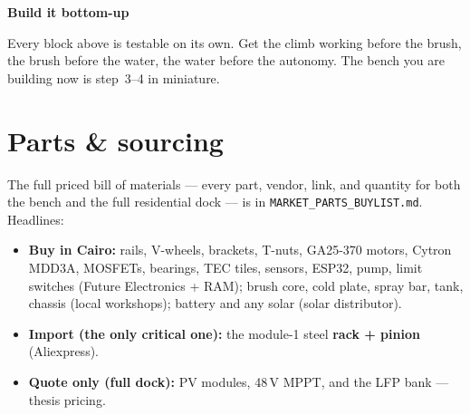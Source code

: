 \documentclass[11pt,a4paper]{article}
\newenvironment{tipbox}[1]
  {\par\medskip\noindent\begin{lrbox}{\gbbox}\begin{minipage}{0.95\linewidth}\footnotesize\textbf{#1}\par\smallskip}
  {\end{minipage}\end{lrbox}\setlength{\fboxsep}{8pt}\fcolorbox{green!45!black}{green!5}{\usebox{\gbbox}}\par\medskip}
\begin{document}
\begin{tipbox}{Build it bottom-up}
Every block above is testable on its own. Get the climb working before the brush, the brush before the
water, the water before the autonomy. The bench you are building now is step~3--4 in miniature.
\end{tipbox}

\section{Parts \& sourcing}

The full priced bill of materials --- every part, vendor, link, and quantity for both the bench and the
full residential dock --- is in \texttt{MARKET\_PARTS\_BUYLIST.md}. Headlines:

\begin{itemize}[leftmargin=*,itemsep=1pt]
  \item \textbf{Buy in Cairo:} rails, V-wheels, brackets, T-nuts, GA25-370 motors, Cytron MDD3A, MOSFETs,
  bearings, TEC tiles, sensors, ESP32, pump, limit switches (Future Electronics + RAM); brush core,
  cold plate, spray bar, tank, chassis (local workshops); battery and any solar (solar distributor).
  \item \textbf{Import (the only critical one):} the module-1 steel \textbf{rack + pinion} (Aliexpress).
  \item \textbf{Quote only (full dock):} PV modules, 48\,V MPPT, and the LFP bank --- thesis pricing.
\end{itemize}

\vspace{0.3cm}
\noindent{}
\end{document}
